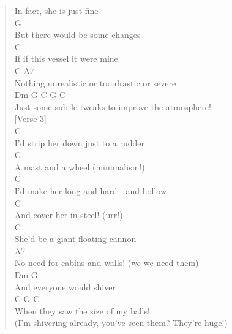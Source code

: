 \documentclass[11pt]{article}
\begin{document}
\begin{verse}
In fact, she is just fine\\
\hspace*{1em}G\\
But there would be some changes\\
\hspace*{1em}C\\
If if this vessel it were mine\\
\hspace*{1em}C                           A7\\
Nothing unrealistic or too drastic or severe\\
\hspace*{1em}Dm                G             C         G       C\\
Just some subtle tweaks to improve the atmosphere!\\
\vspace*{1em}
\vspace*{1em}
[Verse 3]\\
\vspace*{1em}
\hspace*{1em}C\\
I'd strip her down just to a rudder\\
\hspace*{1em}G\\
A mast and a wheel (minimalism!)\\
\hspace*{1em}G\\
I'd make her long and hard - and hollow\\
\hspace*{5em}C\\
And cover her in steel! (urr!)\\
\hspace*{1em}C\\
She'd be a giant floating cannon\\
\hspace*{3em}A7\\
No need for cabins and walls! (we-we need them)\\
\hspace*{1em}Dm                 G\\
And everyone would shiver\\
\hspace*{11em}C       G           C\\
When they saw the size of my balls!\\
\vspace*{1em}
(I'm shivering already, you've seen them? They're huge!)\\

\end{verse}
\end{document}
